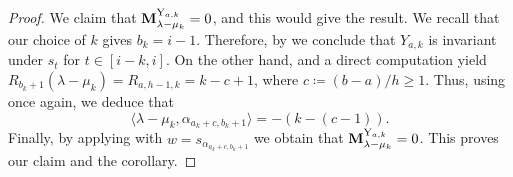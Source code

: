 \begin{proof}
We claim that $\mathbf{M}_{\lambda - \mu_{k}}^{\mathrm{Y}_{a,k}}=0$, and this would give  the result. 
We recall that our choice of  $k$ gives $b_k=i-1$. 
Therefore, by   we conclude that $Y_{a,k}$ is invariant under $s_t$ for $t\in [i-k,i]$. 
On the other hand,   and a direct computation yield $R_{b_k+1}(\lambda-\mu_k) = R_{a,h-1,k} = k-c+1$, where $c\coloneqq (b-a)/h \geq 1$. 
Thus, using   once again, we deduce that 
\begin{equation}
    \langle \lambda -\mu_{k}  , \alpha_{a_{k}+c,b_{k}+1} \rangle = - (k- (c-1)). 
\end{equation}
Finally, by applying  with $w = s_{\alpha_{a_{k}+c,b_{k}+1}}$ we obtain that $\mathbf{M}_{\lambda - \mu_{k}}^{\mathrm{Y}_{a,k}}=0$.
This proves our claim and the corollary. 
\end{proof}

